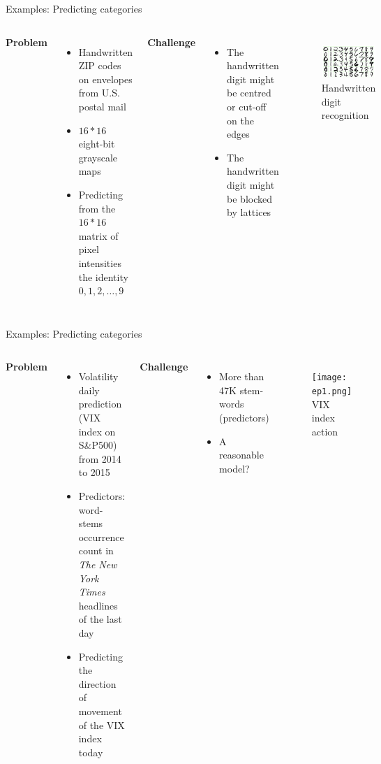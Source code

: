 \documentclass{beamer}
\begin{document}
\begin{frame}{Examples: Predicting categories}
\begin{columns}
\textbf{Problem}
\begin{itemize}
\item Handwritten ZIP codes on envelopes from U.S. postal mail
\item $16*16$ eight-bit grayscale maps
\item Predicting from the $16*16$ matrix of pixel intensities the identity $0, 1, 2, \ldots, 9$
\end{itemize}
\vspace{6pt}
\textbf{Challenge}
\begin{itemize}
\item The handwritten digit might be centred or cut-off on the edges
\item The handwritten digit might be blocked by lattices
\end{itemize}
\begin{figure}
\centering
\includegraphics[width=3cm]{ep5.png}\\
{\tiny Handwritten digit recognition}
\end{figure}
\end{columns}

\end{frame}

\begin{frame}{Examples: Predicting categories}
\begin{columns}
\textbf{Problem}
\begin{itemize}
\item Volatility daily prediction (VIX index on S\&P500) from 2014 to 2015
\item Predictors: word-stems occurrence count in {\it The New York Times} headlines of the last day
\item Predicting the direction of movement of the VIX index today
\end{itemize}
\vspace{6pt}
\textbf{Challenge}
\begin{itemize}
\item More than 47K stem-words (predictors)
\item A reasonable model?
\end{itemize}
\begin{figure}
\centering
\texttt{[image: ep1.png]}
{\tiny VIX index action}
\end{figure}
\end{columns}
\end{frame}
\end{document}
